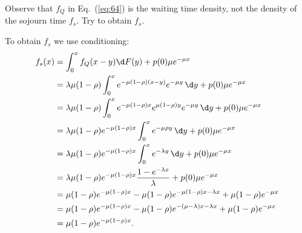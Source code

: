 \begin{exercise}
  Observe that $f_Q$ in Eq.~(\ref{eq:64}) is the waiting time density, not the
  density of the sojourn time $f_s$. Try to obtain $f_s$.
\begin{solution}
    To obtain $f_s$ we use conditioning:
\begin{align*}
f_s(x)
&= \int_0^x f_Q(x-y) \d F(y) + p(0) \mu e^{-\mu x} \\
&= \lambda \mu (1-\rho) \int_0^x  e^{- \mu(1-\rho)(x-y)} e^{-\mu y} \,\d y + p(0) \mu e^{-\mu x} \\
&= \lambda \mu (1-\rho) \int_0^x  e^{- \mu(1-\rho)x} e^{\mu(1-\rho)y} e^{-\mu y} \,\d y + p(0) \mu e^{-\mu x} \\
&= \lambda \mu (1-\rho) e^{- \mu(1-\rho)x} \int_0^x  e^{- \mu \rho y} \, \d y + p(0) \mu e^{-\mu x} \\
&= \lambda \mu (1-\rho) e^{- \mu(1-\rho)x} \int_0^x  e^{- \lambda y} \,\d y + p(0) \mu e^{-\mu x} \\
&= \lambda \mu (1-\rho) e^{- \mu(1-\rho)x} \frac{1 - e^{- \lambda x}}{\lambda} + p(0) \mu e^{-\mu x} \\
&= \mu (1-\rho) e^{- \mu(1-\rho)x} - \mu (1-\rho) e^{- \mu(1-\rho)x - \lambda x} + \mu (1-\rho) e^{-\mu x} \\
&= \mu (1-\rho) e^{- \mu(1-\rho)x} - \mu (1-\rho) e^{- (\mu - \lambda) x - \lambda x} + \mu (1-\rho) e^{-\mu x} \\
&= \mu (1-\rho) e^{- \mu(1-\rho)x}.
\end{align*}
\end{solution}
\end{exercise}
